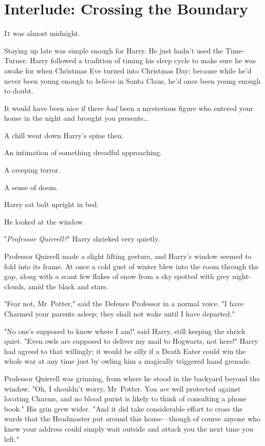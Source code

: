 \chapter{Interlude: Crossing the Boundary}

\lettrine{I}{t} was almost
midnight.

\quad\quad
Staying up late was simple enough for Harry. He just hadn’t used the
Time-Turner. Harry followed a tradition of timing his sleep cycle to make sure
he was awake for when Christmas Eve turned into Christmas Day; because while
he’d never been young enough to \emph{believe} in Santa Claus, he’d once been
young enough to doubt.

It would have been nice if there \emph{had} been a mysterious figure who
entered your house in the night and brought you presents…

A chill went down Harry’s spine then.

An intimation of something dreadful approaching.

A creeping terror.

A sense of doom.

Harry sat bolt upright in bed.

He looked at the window.

"\emph{Professor Quirrell?}" Harry shrieked very quietly.

Professor Quirrell made a slight lifting gesture, and Harry’s window seemed to
fold into its frame. At once a cold gust of winter blew into the room through
the gap, along with a scant few flakes of snow from a sky spotted with grey
night-clouds, amid the black and stars.

"Fear not, Mr~Potter," said the Defence Professor in a normal voice. "I have
Charmed your parents asleep; they shall not wake until I have departed."

"No one’s supposed to know where I am!" said Harry, still keeping the shriek
quiet. "Even owls are supposed to deliver my mail to Hogwarts, not here!" Harry
had agreed to that willingly; it would be silly if a Death Eater could win the
whole war at any time just by owling him a magically triggered hand grenade.

Professor Quirrell was grinning, from where he stood in the backyard beyond the
window. "Oh, I shouldn’t worry, Mr~Potter. You \emph{are} well protected
against locating Charms, and no blood purist is likely to think of consulting a
phone book." His grin grew wider. "And it did take considerable effort to cross
the wards that the Headmaster put around this house—though of course anyone
who knew your address could simply wait outside and attack you the next time
you left."

